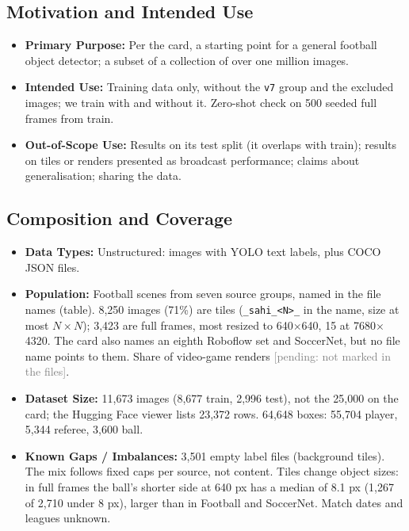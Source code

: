 \documentclass[11pt, a4paper]{article}
\newcommand{\pending}[1]{\textcolor{gray}{[pending: #1]}}
\begin{document}
\subsection{Motivation and Intended Use}
\begin{itemize}
    \item \textbf{Primary Purpose:} Per the card, a starting point for a general football object detector; a subset of a collection of over one million images.
    \item \textbf{Intended Use:} Training data only, without the \texttt{v7} group and the excluded images; we train with and without it. Zero-shot check on 500 seeded full frames from train.
    \item \textbf{Out-of-Scope Use:} Results on its test split (it overlaps with train); results on tiles or renders presented as broadcast performance; claims about generalisation; sharing the data.
\end{itemize}

\subsection{Composition and Coverage}
\begin{itemize}
    \item \textbf{Data Types:} Unstructured: images with YOLO text labels, plus COCO JSON files.
    \item \textbf{Population:} Football scenes from seven source groups, named in the file names (table). 8,250 images (71\%) are tiles (\texttt{\_sahi\_<N>\_} in the name, size at most $N\times N$); 3,423 are full frames, most resized to 640$\times$640, 15 at 7680$\times$4320. The card also names an eighth Roboflow set and SoccerNet, but no file name points to them. Share of video-game renders \pending{not marked in the files}.
    \item \textbf{Dataset Size:} 11,673 images (8,677 train, 2,996 test), not the 25,000 on the card; the Hugging Face viewer lists 23,372 rows. 64,648 boxes: 55,704 player, 5,344 referee, 3,600 ball.
    \item \textbf{Known Gaps / Imbalances:} 3,501 empty label files (background tiles). The mix follows fixed caps per source, not content. Tiles change object sizes: in full frames the ball's shorter side at 640 px has a median of 8.1 px (1,267 of 2,710 under 8 px), larger than in Football and SoccerNet. Match dates and leagues unknown.
\end{itemize}
\end{document}
